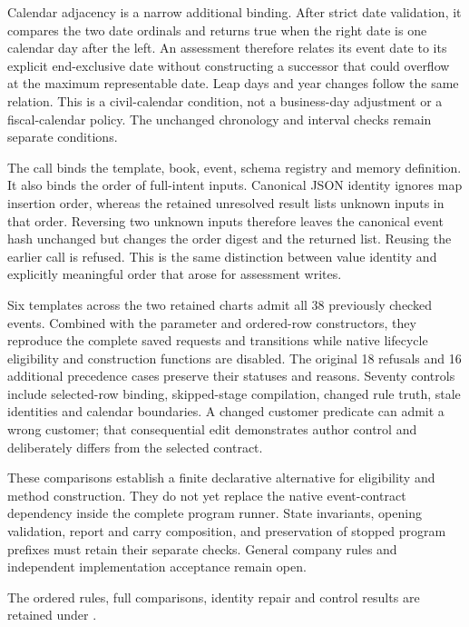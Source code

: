 Calendar adjacency is a narrow additional binding. After strict date
validation, it compares the two date ordinals and returns true when the right
date is one calendar day after the left. An assessment therefore relates its
event date to its explicit end-exclusive date without constructing a successor
that could overflow at the maximum representable date. Leap days and year
changes follow the same relation. This is a civil-calendar condition, not a
business-day adjustment or a fiscal-calendar policy. The unchanged chronology
and interval checks remain separate conditions.

The call binds the template, book, event, schema registry and memory definition.
It also binds the order of full-intent inputs. Canonical JSON identity ignores
map insertion order, whereas the retained unresolved result lists unknown
inputs in that order. Reversing two unknown inputs therefore leaves the
canonical event hash unchanged but changes the order digest and the returned
list. Reusing the earlier call is refused. This is the same distinction between
value identity and explicitly meaningful order that arose for assessment writes.

Six templates across the two retained charts admit all 38 previously checked
events. Combined with the parameter and ordered-row constructors, they reproduce
the complete saved requests and transitions while native lifecycle eligibility
and construction functions are disabled. The original 18 refusals and 16
additional precedence cases preserve their statuses and reasons. Seventy
controls include selected-row binding, skipped-stage compilation, changed rule
truth, stale identities and calendar boundaries. A changed customer predicate
can admit a wrong customer; that consequential edit demonstrates author control
and deliberately differs from the selected contract.

These comparisons establish a finite declarative alternative for eligibility
and method construction. They do not yet replace the native event-contract
dependency inside the complete program runner. State invariants, opening
validation, report and carry composition, and preservation of stopped program
prefixes must retain their separate checks. General company rules and
independent implementation acceptance remain open.

\begingroup\raggedright
The ordered rules, full comparisons, identity repair and control results are
retained under
.
\par
\endgroup
